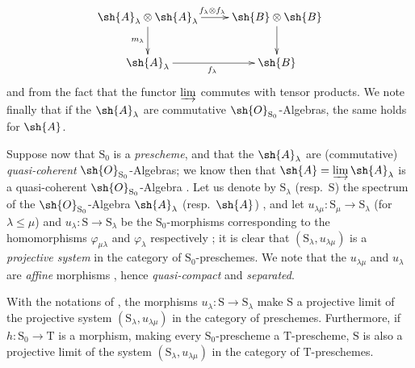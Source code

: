 \begin{env}[8.2.1]
\[
\xymatrix{
  \sh{A}_\lambda\otimes\sh{A}_\lambda \ar[r]^{f_\lambda\otimes f_\lambda} \ar[d]_{m_\lambda} & \sh{B}\otimes\sh{B} \ar[d] \\
  \sh{A}_\lambda \ar[r]_{f_\lambda} & \sh{B}
}
\]
and from the fact that the functor $\varinjlim$ commutes with tensor products.
We note finally that if the $\sh{A}_\lambda$ are commutative $\sh{O}_{\mathrm{S}_0}$-Algebras, the same holds for $\sh{A}$.
\end{env}

\begin{env}[8.2.2]
\label{IV.8.2.2}
Suppose now that $\mathrm{S}_0$ is a \emph{prescheme}, and that the $\sh{A}_\lambda$ are (commutative) \emph{quasi-coherent} $\sh{O}_{\mathrm{S}_0}$-Algebras; we know then that $\sh{A}=\varinjlim\sh{A}_\lambda$ is a quasi-coherent $\sh{O}_{\mathrm{S}_0}$-Algebra .
Let us denote by $\mathrm{S}_\lambda$ (resp.\ $\mathrm{S}$) the spectrum of the $\sh{O}_{\mathrm{S}_0}$-Algebra $\sh{A}_\lambda$ (resp.\ $\sh{A}$) , and let $u_{\lambda\mu}:\mathrm{S}_\mu\to\mathrm{S}_\lambda$ (for $\lambda\leqslant\mu$) and $u_\lambda:\mathrm{S}\to\mathrm{S}_\lambda$ be the $\mathrm{S}_0$-morphisms corresponding to the homomorphisms $\varphi_{\mu\lambda}$ and $\varphi_\lambda$ respectively ; it is clear that $(\mathrm{S}_\lambda,u_{\lambda\mu})$ is a \emph{projective system} in the category of $\mathrm{S}_0$-preschemes.
We note that the $u_{\lambda\mu}$ and $u_\lambda$ are \emph{affine} morphisms , hence \emph{quasi-compact} and \emph{separated}.
\end{env}

\begin{proposition}[8.2.3]
\label{IV.8.2.3}
With the notations of , the morphisms $u_\lambda:\mathrm{S}\to\mathrm{S}_\lambda$ make $\mathrm{S}$ a projective limit of the projective system $(\mathrm{S}_\lambda,u_{\lambda\mu})$ in the category of preschemes.
Furthermore, if $h:\mathrm{S}_0\to\mathrm{T}$ is a morphism, making every $\mathrm{S}_0$-prescheme a $\mathrm{T}$-prescheme, $\mathrm{S}$ is also a projective limit of the system $(\mathrm{S}_\lambda,u_{\lambda\mu})$ in the category of $\mathrm{T}$-preschemes.
\end{proposition}

